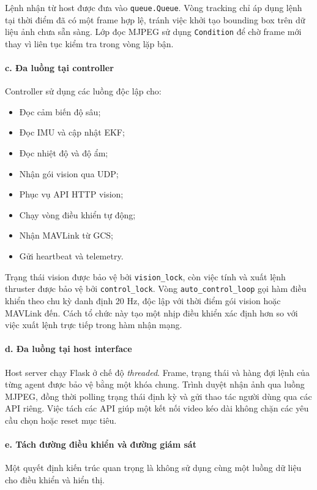 \documentclass[../DoAn.tex]{subfiles}
\begin{document}
Lệnh nhận từ host được đưa vào \texttt{queue.Queue}. Vòng tracking chỉ áp dụng lệnh tại thời điểm đã có một frame hợp lệ, tránh việc khởi tạo bounding box trên dữ liệu ảnh chưa sẵn sàng. Lớp đọc MJPEG sử dụng \texttt{Condition} để chờ frame mới thay vì liên tục kiểm tra trong vòng lặp bận.

\paragraph{c. Đa luồng tại controller}
Controller sử dụng các luồng độc lập cho:
\begin{itemize}
    \item Đọc cảm biến độ sâu;
    \item Đọc IMU và cập nhật EKF;
    \item Đọc nhiệt độ và độ ẩm;
    \item Nhận gói vision qua UDP;
    \item Phục vụ API HTTP vision;
    \item Chạy vòng điều khiển tự động;
    \item Nhận MAVLink từ GCS;
    \item Gửi heartbeat và telemetry.
\end{itemize}

Trạng thái vision được bảo vệ bởi \texttt{vision\_lock}, còn việc tính và xuất lệnh thruster được bảo vệ bởi \texttt{control\_lock}. Vòng \texttt{auto\_control\_loop} gọi hàm điều khiển theo chu kỳ danh định 20 Hz, độc lập với thời điểm gói vision hoặc MAVLink đến. Cách tổ chức này tạo một nhịp điều khiển xác định hơn so với việc xuất lệnh trực tiếp trong hàm nhận mạng.

\paragraph{d. Đa luồng tại host interface}
Host server chạy Flask ở chế độ \textit{threaded}. Frame, trạng thái và hàng đợi lệnh của từng agent được bảo vệ bằng một khóa chung. Trình duyệt nhận ảnh qua luồng MJPEG, đồng thời polling trạng thái định kỳ và gửi thao tác người dùng qua các API riêng. Việc tách các API giúp một kết nối video kéo dài không chặn các yêu cầu chọn hoặc reset mục tiêu.

\paragraph{e. Tách đường điều khiển và đường giám sát}
Một quyết định kiến trúc quan trọng là không sử dụng cùng một luồng dữ liệu cho điều khiển và hiển thị. 
\end{document}
